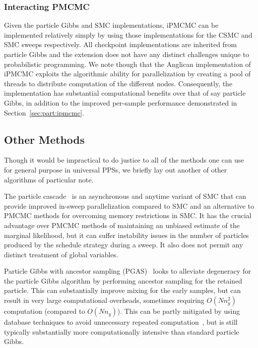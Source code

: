 \subsubsection{Interacting PMCMC}
\label{sec:proginf:str:part:ipmcmc}

Given the particle Gibbs and SMC implementations, iPMCMC can be implemented
relatively simply by using those implementations for the CSMC and SMC sweeps respectively.
All checkpoint implementations are inherited from particle Gibbs and the extension does
not have any distinct challenges unique to probabilistic programming.  We note though that
the Anglican implementation of iPMCMC exploits the algorithmic ability for parallelization 
by creating a pool of threads to distribute computation of the different nodes.   Consequently,
the implementation has substantial computational benefits over that of say particle Gibbs, in addition
to the improved per-sample performance demonstrated in Section~\ref{sec:part:ipmcmc}.

\subsection{Other Methods}
\label{sec:proginf:str:part:other}

Though it would be impractical to do justice to all of the methods one can use for general
purpose in universal PPSs, we briefly lay out another of other algorithms of particular note.

The particle cascade~\citep{paige2014asynchronous} is an asynchronous and anytime
	variant of SMC that can provide improved in-sweep parallelization compared to SMC
	and an alternative to PMCMC methods for overcoming memory restrictions in
	SMC.  It has the crucial advantage over PMCMC methods of maintaining an unbiased estimate
	of the marginal likelihood, but it can suffer instability issues in the number of particles produced
	by the schedule strategy during a sweep. It also does not permit any distinct treatment of global
	variables.

Particle Gibbs with ancestor sampling (PGAS)~\citep{lindstenJS2014,vandemeent_aistats_2015}
	looks to alleviate degeneracy for the particle Gibbs algorithm by performing ancestor sampling
	for the retained particle.  This can substantially improve mixing for the early samples, but can
	result in very large computational overheads, sometimes requiring $O(Nn_y^2)$ computation
	(compared to $O(Nn_y)$).  This can be partly 
	mitigated by using database techniques to avoid unnecessary
	repeated computation~\citep{vandemeent_aistats_2015}, but is still typically substantially more computationally intensive than
	standard particle Gibbs.  

